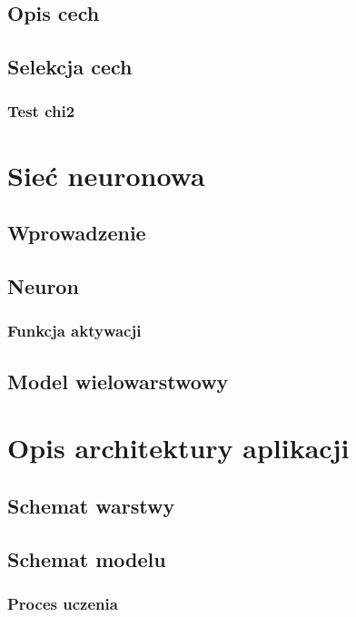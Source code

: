 \section{Opis cech}

\section{Selekcja cech}

\subsection{Test chi2}

\chapter{Sieć neuronowa}

\section{Wprowadzenie}

\section{Neuron}

\subsection{Funkcja aktywacji}

\section{Model wielowarstwowy}

\chapter{Opis architektury aplikacji}

\section{Schemat warstwy}

\section{Schemat modelu}

\subsection{Proces uczenia}

